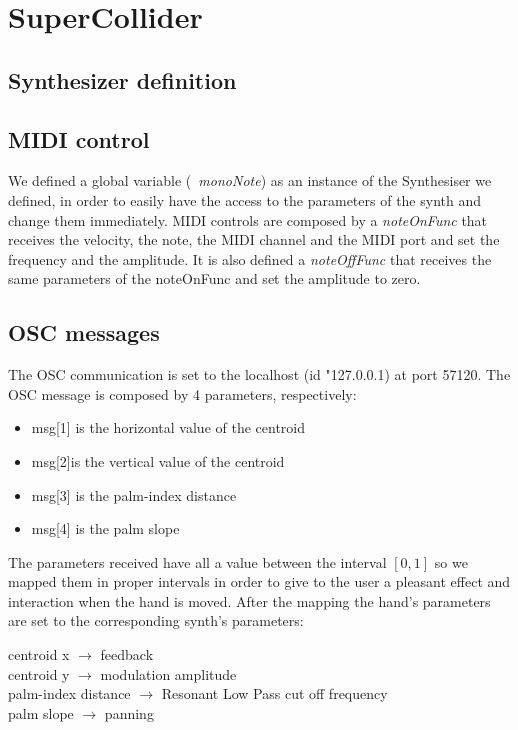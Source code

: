 \documentclass[a4paper,12pt]{report}
\begin{document}
\section*{SuperCollider}

\subsection*{Synthesizer definition}

\subsection*{MIDI control} 
We defined a global variable (\emph{~monoNote}) as an instance of the Synthesiser we defined, in order to easily have the access to the parameters of the synth and change them immediately.
MIDI controls are composed by a \emph{noteOnFunc} that receives the velocity, the note, the MIDI channel and the MIDI port and set the frequency and the amplitude. It is also defined a \emph{noteOffFunc} that receives the same parameters of the noteOnFunc and set the amplitude to zero.

\subsection*{OSC messages}
The OSC communication is set to the localhost (id "127.0.0.1) at port 57120. The OSC message is composed by 4 parameters, respectively: 
\begin{itemize}
	\item msg[1] is the horizontal value of the centroid
	\item msg[2]is the vertical value of the centroid
	\item msg[3] is the palm-index distance
	\item msg[4] is the palm slope
\end{itemize}
The parameters received have all a value between the interval $[0,1]$ so we mapped them in proper intervals in order to give to the user a pleasant effect and interaction when the hand is moved. After the mapping the hand's parameters are set to the corresponding synth's parameters:
\begin{center}
centroid x $\rightarrow$ feedback\\
centroid y $\rightarrow$ modulation amplitude\\
palm-index distance $\rightarrow$ Resonant Low Pass cut off frequency\\
palm slope $\rightarrow$ panning\\
\end{center}
\end{document}
